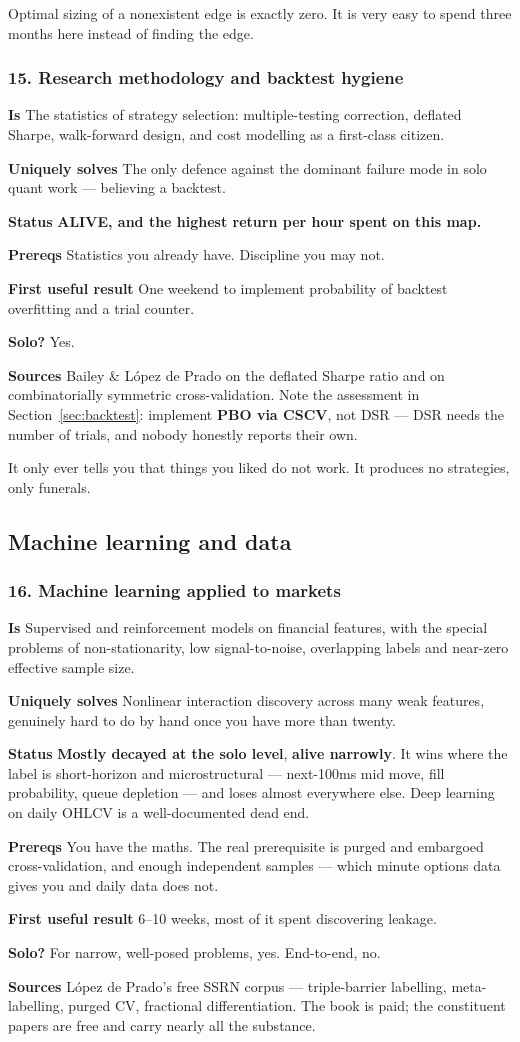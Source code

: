 \documentclass[11pt,a4paper]{article}
\newcommand{\alv}[1]{\textcolor{alive}{\textbf{#1}}}
\newcommand{\dec}[1]{\textcolor{decayed}{\textbf{#1}}}
\newcommand{\fitem}[1]{\par\smallskip\noindent\textbf{#1} }
\begin{document}
\begin{waste}
Optimal sizing of a nonexistent edge is exactly zero. It is very easy to spend
three months here instead of finding the edge.
\end{waste}

\subsubsection{15. Research methodology and backtest hygiene}
\fitem{Is}The statistics of strategy selection: multiple-testing correction,
deflated Sharpe, walk-forward design, and cost modelling as a first-class citizen.
\fitem{Uniquely solves}The only defence against the dominant failure mode in solo
quant work --- believing a backtest.
\fitem{Status}\alv{ALIVE, and the highest return per hour spent on this map.}
\fitem{Prereqs}Statistics you already have. Discipline you may not.
\fitem{First useful result}One weekend to implement probability of backtest
overfitting and a trial counter.
\fitem{Solo?}Yes.
\fitem{Sources}Bailey \& L\'opez de Prado on the deflated Sharpe ratio and on
combinatorially symmetric cross-validation. Note the assessment in
Section~\ref{sec:backtest}: implement \textbf{PBO via CSCV}, not DSR --- DSR needs
the number of trials, and nobody honestly reports their own.

\begin{waste}
It only ever tells you that things you liked do not work. It produces no
strategies, only funerals.
\end{waste}

\subsection{Machine learning and data}

\subsubsection{16. Machine learning applied to markets}
\fitem{Is}Supervised and reinforcement models on financial features, with the
special problems of non-stationarity, low signal-to-noise, overlapping labels and
near-zero effective sample size.
\fitem{Uniquely solves}Nonlinear interaction discovery across many weak features,
genuinely hard to do by hand once you have more than twenty.
\fitem{Status}\dec{Mostly decayed at the solo level}, \alv{alive narrowly}. It
wins where the label is short-horizon and microstructural --- next-100ms mid
move, fill probability, queue depletion --- and loses almost everywhere else.
Deep learning on daily OHLCV is a well-documented dead end.
\fitem{Prereqs}You have the maths. The real prerequisite is purged and embargoed
cross-validation, and enough independent samples --- which minute options data
gives you and daily data does not.
\fitem{First useful result}6--10 weeks, most of it spent discovering leakage.
\fitem{Solo?}For narrow, well-posed problems, yes. End-to-end, no.
\fitem{Sources}L\'opez de Prado's free SSRN corpus --- triple-barrier labelling,
meta-labelling, purged CV, fractional differentiation. The book is paid; the
constituent papers are free and carry nearly all the substance.
\end{document}
